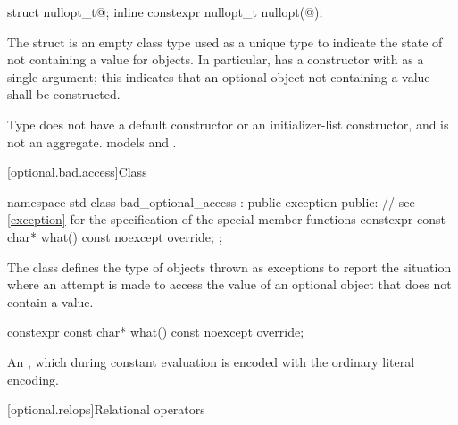 \begin{addedblock}
%
\begin{itemdecl}
struct nullopt_t{@\seebelow@};
inline constexpr nullopt_t nullopt(@\unspec@);
\end{itemdecl}

\begin{itemdescr}
\pnum
The struct  is an empty class type used as a unique type to indicate the state of not containing a value for  objects. In particular,  has a constructor with  as a single argument; this indicates that an optional object not containing a value shall be constructed.

\pnum
Type  does not have a default constructor or an initializer-list constructor, and is not an aggregate.  models  and .
\end{itemdescr}
\end{addedblock}

\begin{removedblock}
[optional.bad.access]{Class }

\begin{codeblock}
namespace std {
  class bad_optional_access : public exception {
  public:
    // see \ref{exception} for the specification of the special member functions
    constexpr const char* what() const noexcept override;
  };
}
\end{codeblock}

\pnum
The class  defines the type of objects thrown as exceptions to report the situation where an attempt is made to access the value of an optional object that does not contain a value.

%
\begin{itemdecl}
constexpr const char* what() const noexcept override;
\end{itemdecl}

\begin{itemdescr}
\pnum
\returns
An  \ntbs{}, which during constant evaluation is encoded with the ordinary literal encoding.
\end{itemdescr}
\end{removedblock}

[optional.relops]{Relational operators}

